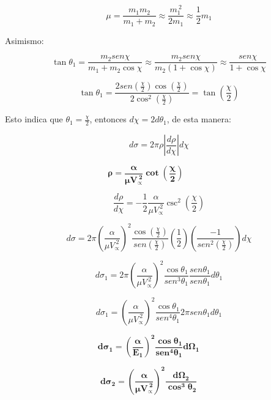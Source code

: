 \documentclass[]{article}
\begin{document}
\[\mu = \frac{m_{1}m_{2}}{m_{1} + m_{2}} \approx \frac{m_{1}^{\ 2}}{2m_{1}} \approx \frac{1}{2}m_{1}\]

Asimismo:

\[\tan\theta_{1} = \frac{m_{2}{sen}\chi}{m_{1} + m_{2}\cos\chi} \approx \frac{m_{2}{sen}\chi}{m_{2}\left( 1 + \cos\chi \right)} \approx \frac{{sen}\chi}{1 + \cos\chi}\]

\[\tan\theta_{1} = \frac{2{sen}{\left( \frac{\chi}{2} \right)\cos\left( \frac{\chi}{2} \right)}}{2\cos^{2}\left( \frac{\chi}{2} \right)} = \tan\left( \frac{\chi}{2} \right)\]

Esto indica que \(\theta_{1} = \frac{\chi}{2}\), entonces
\(d\chi = 2d\theta_{1}\), de esta manera:

\[d\sigma = 2\pi\rho\left| \frac{d\rho}{d\chi} \right|d\chi\]

\[\mathbf{\rho =}\frac{\mathbf{\alpha}}{\mathbf{\mu}\mathbf{V}_{\mathbf{\propto}}^{\mathbf{\ 2}}}\mathbf{\cot}\left( \frac{\mathbf{\chi}}{\mathbf{2}} \right)\mathbf{\ \ \ \ \ \ \ \ \ \ \ \ \ \ }\]

\[\frac{d\rho}{d\chi} = - \frac{1}{2}\frac{\alpha}{\mu V_{\propto}^{\ 2}}\csc^{2}\left( \frac{\chi}{2} \right)\]

\[d\sigma = 2\pi\left( \frac{\alpha}{\mu V_{\propto}^{\ 2}} \right)^{2}\frac{\cos\left( \frac{\chi}{2} \right)}{{sen}\left( \frac{\chi}{2} \right)}\left( \frac{1}{2} \right)\left( \frac{- 1}{{sen}^{2}\left( \frac{\chi}{2} \right)} \right)d\chi\]

\[d\sigma_{1} = {2\pi\left( \frac{\alpha}{\mu V_{\propto}^{\ 2}} \right)}^{2}\frac{\cos\theta_{1}}{{sen}^{3}\theta_{1}}\frac{{sen}\theta_{1}}{{sen}\theta_{1}}d\theta_{1}\]

\[d\sigma_{1} = \left( \frac{\alpha}{\mu V_{\propto}^{\ 2}} \right)^{2}\frac{\cos\theta_{1}}{{sen}^{4}\theta_{1}}2\pi{sen}{\theta_{1}d\theta_{1}}\]

\[\mathbf{d}\mathbf{\sigma}_{\mathbf{1}}\mathbf{=}\left( \frac{\mathbf{\alpha}}{\mathbf{E}_{\mathbf{1}}} \right)^{\mathbf{2}}\frac{\mathbf{\cos}\mathbf{\theta}_{\mathbf{1}}}{\mathbf{sen}^{\mathbf{4}}\mathbf{\theta}_{\mathbf{1}}}\mathbf{d}\mathbf{\Omega}_{\mathbf{1}}\mathbf{\ \ \ \ \ \ \ \ \ \ \ }\]

\[\mathbf{d}\mathbf{\sigma}_{\mathbf{2}}\mathbf{=}\left( \frac{\mathbf{\alpha}}{\mathbf{\mu}\mathbf{V}_{\mathbf{\propto}}^{\mathbf{\ 2}}} \right)^{\mathbf{2}}\frac{\mathbf{d}\mathbf{\Omega}_{\mathbf{2}}}{\mathbf{\cos}^{\mathbf{3}}\mathbf{\theta}_{\mathbf{2}}}\mathbf{\ \ \ \ \ \ \ \ \ \ \ }\]
\end{document}

